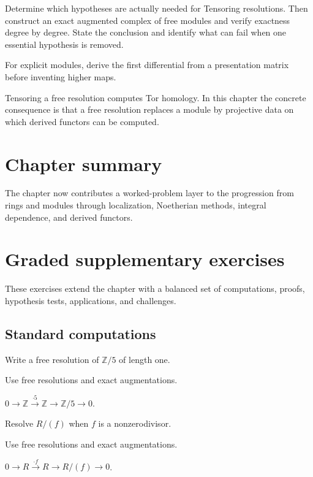 \begin{exercise}\label{exr:v23-08}
Determine which hypotheses are actually needed for Tensoring resolutions. Then construct an exact augmented complex of free modules and verify exactness degree by degree. State the conclusion and identify what can fail when one essential hypothesis is removed.
\end{exercise}
\begin{hint}
For explicit modules, derive the first differential from a presentation matrix before inventing higher maps.
\end{hint}
\begin{solution}
Tensoring a free resolution computes Tor homology. In this chapter the concrete consequence is that a free resolution replaces a module by projective data on which derived functors can be computed.
\end{solution}

\section*{Chapter summary}
The chapter now contributes a worked-problem layer to the progression from rings and modules through localization, Noetherian methods, integral dependence, and derived functors.
\section{Graded supplementary exercises}
These exercises extend the chapter with a balanced set of computations, proofs, hypothesis tests, applications, and challenges.

\subsection*{Standard computations}

\begin{exercise}\label{exr:v23-expand-01}
Write a free resolution of $\mathbb Z/5$ of length one.
\end{exercise}
\begin{hint}
Use free resolutions and exact augmentations.
\end{hint}
\begin{solution}
$0\to\mathbb Z\xrightarrow{\cdot5}\mathbb Z\to\mathbb Z/5\to0$.
\end{solution}

\begin{exercise}\label{exr:v23-expand-02}
Resolve $R/(f)$ when $f$ is a nonzerodivisor.
\end{exercise}
\begin{hint}
Use free resolutions and exact augmentations.
\end{hint}
\begin{solution}
$0\to R\xrightarrow{\cdot f}R\to R/(f)\to0$.
\end{solution}

